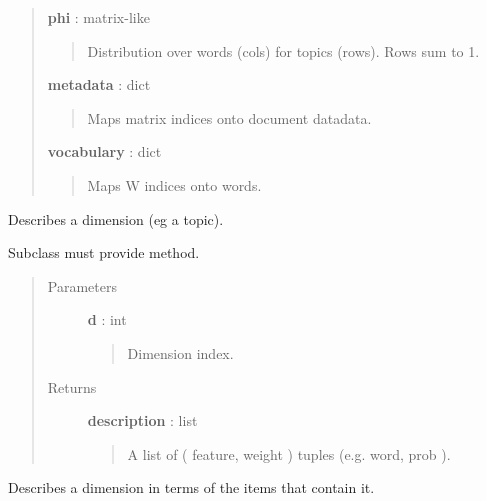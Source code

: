 \documentclass[letterpaper,10pt,english]{sphinxmanual}
\begin{document}
\begin{fulllineitems}
\begin{quote}
\begin{description}
\textbf{phi} : matrix-like
\begin{quote}

Distribution over words (cols) for topics (rows). Rows sum to 1.
\end{quote}

\textbf{metadata} : dict
\begin{quote}

Maps matrix indices onto document datadata.
\end{quote}

\textbf{vocabulary} : dict
\begin{quote}

Maps W indices onto words.
\end{quote}

\end{description}\end{quote}

\begin{fulllineitems}
\label{tethne.model.corpus.ldamodel:tethne.model.corpus.ldamodel.LDAModel.dimension}
Describes a dimension (eg a topic).

Subclass must provide  method.
\begin{quote}\begin{description}
\item[{Parameters}] \leavevmode
\textbf{d} : int
\begin{quote}

Dimension index.
\end{quote}

\item[{Returns}] \leavevmode
\textbf{description} : list
\begin{quote}

A list of ( feature, weight ) tuples (e.g. word, prob ).
\end{quote}

\end{description}\end{quote}

\end{fulllineitems}


\begin{fulllineitems}
\label{tethne.model.corpus.ldamodel:tethne.model.corpus.ldamodel.LDAModel.dimension_items}
Describes a dimension in terms of the items that contain it.


\end{fulllineitems}
\end{fulllineitems}
\end{document}
